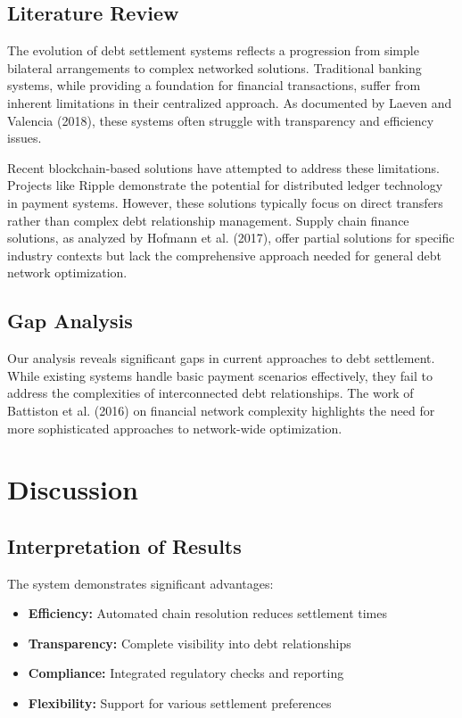 \documentclass[twocolumn,10pt,a4paper]{article}
\begin{document}
\subsection{Literature Review}
The evolution of debt settlement systems reflects a progression from simple bilateral arrangements to complex networked solutions. Traditional banking systems, while providing a foundation for financial transactions, suffer from inherent limitations in their centralized approach. As documented by Laeven and Valencia (2018)\cite{laeven2018systemic}, these systems often struggle with transparency and efficiency issues.

Recent blockchain-based solutions have attempted to address these limitations. Projects like Ripple\cite{ripple2014protocol} demonstrate the potential for distributed ledger technology in payment systems. However, these solutions typically focus on direct transfers rather than complex debt relationship management. Supply chain finance solutions, as analyzed by Hofmann et al. (2017)\cite{hofmann2017supply}, offer partial solutions for specific industry contexts but lack the comprehensive approach needed for general debt network optimization.

\subsection{Gap Analysis}
Our analysis reveals significant gaps in current approaches to debt settlement. While existing systems handle basic payment scenarios effectively, they fail to address the complexities of interconnected debt relationships. The work of Battiston et al. (2016)\cite{battiston2016complexity} on financial network complexity highlights the need for more sophisticated approaches to network-wide optimization.

\section{Discussion}
\subsection{Interpretation of Results}
The system demonstrates significant advantages:
\begin{itemize}
    \item \textbf{Efficiency:} Automated chain resolution reduces settlement times
    \item \textbf{Transparency:} Complete visibility into debt relationships
    \item \textbf{Compliance:} Integrated regulatory checks and reporting
    \item \textbf{Flexibility:} Support for various settlement preferences
\end{itemize}
\end{document}
